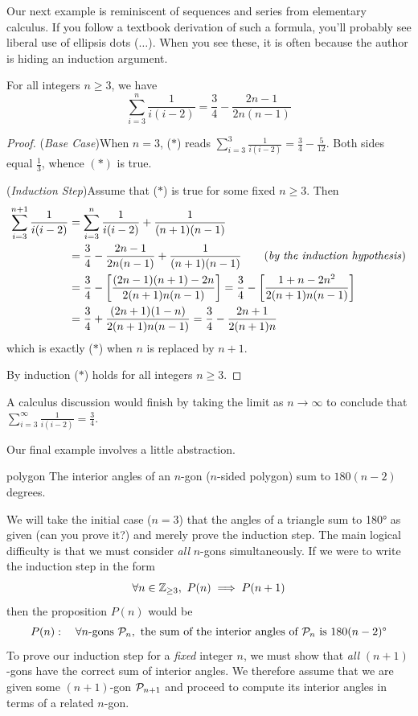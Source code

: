 Our next example is reminiscent of sequences and series from elementary calculus. If you follow a textbook derivation of such a formula, you'll probably see liberal use of ellipsis dots ($\ldots$). When you see these, it is often because the author is hiding an induction argument.

\begin{thm}{}{}
	For all integers $n\ge 3$, we have
	\[
		\sum\limits_{i=3}^n\frac 1{i(i-2)}=\frac 34-\frac{2n-1}{2n(n-1)}\tag{$\ast$}
	\]
\end{thm}

\begin{proof}
	(\emph{Base Case})\quad When $n=3$, ($\ast$) reads $\sum\limits_{i=3}^3\frac 1{i(i-2)}=\frac 34-\frac 5{12}$. Both sides equal $\frac 13$, whence $(\ast)$ is true.\par
	(\emph{Induction Step})\quad Assume that ($\ast$) is true for some fixed $n\ge 3$. Then
	\begin{align*}
		\sum_{i=3}^{n+1}\frac 1{i(i-2)}&=\sum_{i=3}^{n}\frac 1{i(i-2)}+\frac 1{(n+1)(n-1)}\\
		&=\frac 34-\frac{2n-1}{2n(n-1)}+\frac 1{(n+1)(n-1)}\tag*{(\emph{by the induction hypothesis})}\\
		&=\frac 34-\left[\frac{(2n-1)(n+1)-2n}{2(n+1)n(n-1)}\right]=\frac 34-\left[\frac{1+n-2n^2}{2(n+1)n(n-1)}\right]\\
		&=\frac 34+\frac{(2n+1)(1-n)}{2(n+1)n(n-1)}=\frac 34-\frac{2n+1}{2(n+1)n}
	\end{align*}
	which is exactly ($\ast$) when $n$ is replaced by $n+1$.\par
	By induction ($\ast$) holds for all integers $n\ge 3$.
\end{proof}

A calculus discussion would finish by taking the limit as $n\to\infty$ to conclude that $\sum\limits_{i=3}^\infty\frac 1{i(i-2)}=\frac 34$.


Our final example involves a little abstraction.

\begin{thm}{}{polygon}
	The interior angles of an $n$-gon ($n$-sided polygon) sum to $180(n-2)$ degrees.
\end{thm}

We will take the initial case ($n=3$) that the angles of a triangle sum to \ang{180} as given (can you prove it?) and merely prove the induction step. The main logical difficulty is that we must consider \emph{all} $n$-gons simultaneously. If we were to write the induction step in the form
\[
	\forall n\in\mathbb{Z}_{\ge 3},\ P(n)\implies P(n+1)
\]
then the proposition $P(n)$ would be
\[
	P(n):\quad \forall n\text{-gons }\mathcal{P}_n,\text{ the sum of the interior angles of $\mathcal{P}_n$ is $180(n-2)$\textdegree}
\]
To prove our induction step for a \emph{fixed} integer $n$, we must show that \emph{all} $(n+1)$-gons have the correct sum of interior angles. We therefore assume that we are given some $(n+1)$-gon $\mathcal{P}_{n+1}$ and proceed to compute its interior angles in terms of a related $n$-gon.

